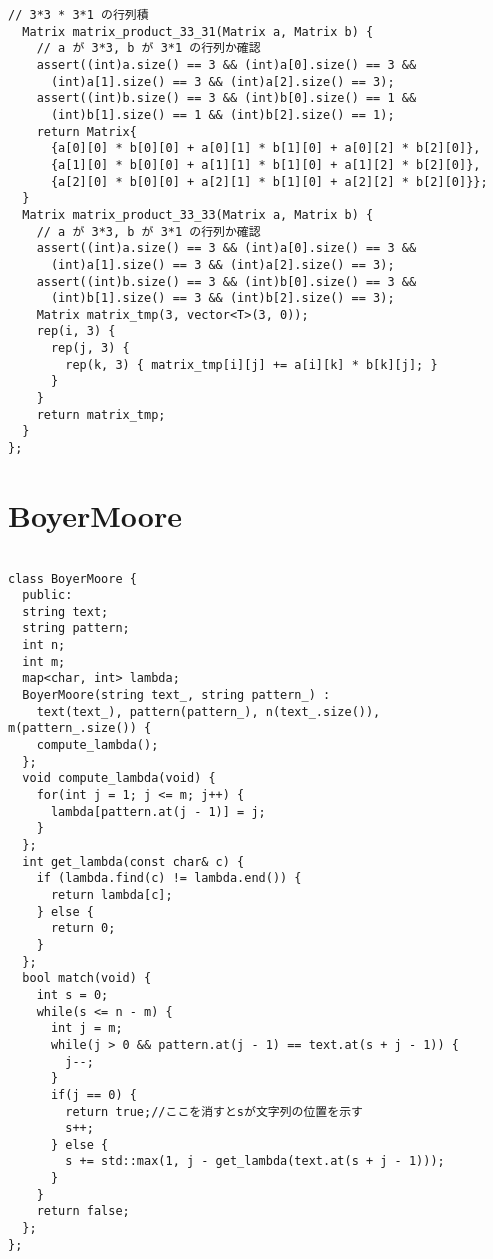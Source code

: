 \documentclass{jsarticle}
\begin{document}
\begin{lstlisting}[caption=AffineMap]
  // 3*3 * 3*1 の行列積
  Matrix matrix_product_33_31(Matrix a, Matrix b) {
    // a が 3*3, b が 3*1 の行列か確認
    assert((int)a.size() == 3 && (int)a[0].size() == 3 &&
      (int)a[1].size() == 3 && (int)a[2].size() == 3);
    assert((int)b.size() == 3 && (int)b[0].size() == 1 &&
      (int)b[1].size() == 1 && (int)b[2].size() == 1);
    return Matrix{
      {a[0][0] * b[0][0] + a[0][1] * b[1][0] + a[0][2] * b[2][0]},
      {a[1][0] * b[0][0] + a[1][1] * b[1][0] + a[1][2] * b[2][0]},
      {a[2][0] * b[0][0] + a[2][1] * b[1][0] + a[2][2] * b[2][0]}};
  }
  Matrix matrix_product_33_33(Matrix a, Matrix b) {
    // a が 3*3, b が 3*1 の行列か確認
    assert((int)a.size() == 3 && (int)a[0].size() == 3 &&
      (int)a[1].size() == 3 && (int)a[2].size() == 3);
    assert((int)b.size() == 3 && (int)b[0].size() == 3 &&
      (int)b[1].size() == 3 && (int)b[2].size() == 3);
    Matrix matrix_tmp(3, vector<T>(3, 0));
    rep(i, 3) {
      rep(j, 3) {
        rep(k, 3) { matrix_tmp[i][j] += a[i][k] * b[k][j]; }
      }
    }
    return matrix_tmp;
  }
};

\end{lstlisting}

\color{white}
\section{BoyerMoore}
\color{black}
\begin{lstlisting}[caption=BoyerMoore]

class BoyerMoore {
  public:
  string text;
  string pattern;
  int n;
  int m;
  map<char, int> lambda;
  BoyerMoore(string text_, string pattern_) : 
    text(text_), pattern(pattern_), n(text_.size()), m(pattern_.size()) {
    compute_lambda();
  };
  void compute_lambda(void) {
    for(int j = 1; j <= m; j++) {
      lambda[pattern.at(j - 1)] = j;
    }
  };
  int get_lambda(const char& c) {
    if (lambda.find(c) != lambda.end()) {
      return lambda[c];
    } else {
      return 0;
    }
  };
  bool match(void) {
    int s = 0;
    while(s <= n - m) {
      int j = m;
      while(j > 0 && pattern.at(j - 1) == text.at(s + j - 1)) {
        j--;
      }
      if(j == 0) {
        return true;//ここを消すとsが文字列の位置を示す
        s++;
      } else {
        s += std::max(1, j - get_lambda(text.at(s + j - 1)));
      }
    }
    return false;
  };
};

\end{lstlisting}

\color{white}
\end{document}
